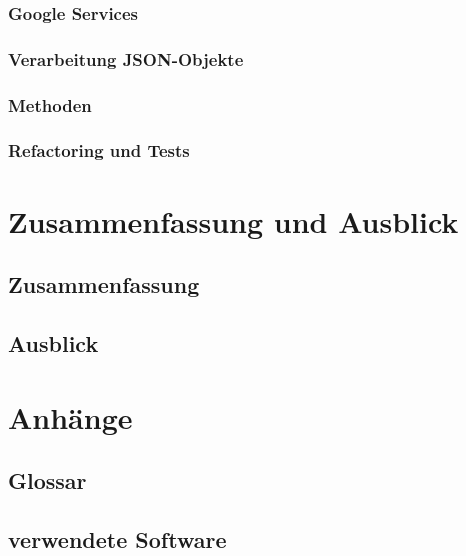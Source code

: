 \documentclass[a4paper, 11pt]{scrreprt}
\begin{document}
\subsection{Google Services}

\subsection{Verarbeitung JSON-Objekte}

\subsection{Methoden}

\subsection{Refactoring und Tests}

\chapter{Zusammenfassung und Ausblick}

\section{Zusammenfassung}

\section{Ausblick}

\chapter{Anhänge}

\section{Glossar}

\section{verwendete Software}
\end{document}
